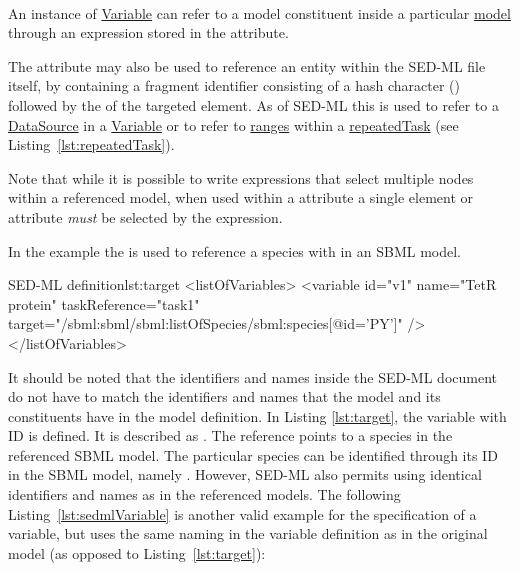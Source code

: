 \paragraph*{}
\label{sec:target}
An instance of \hyperref[class:variable]{Variable} can refer to a model constituent inside a particular \hyperref[class:model]{model} through an  expression stored in the  attribute. 

The  attribute may also be used to reference an entity within the SED-ML file itself, by containing a fragment identifier consisting of a hash character (\code{\#}) followed by the \hyperref[type:sid]{} of the targeted element. As of SED-ML \currentLV this is used to refer to a \hyperref[class:dataSource]{DataSource} in a \hyperref[class:variable]{Variable} or to refer to \hyperref[sec:listOfRanges]{ranges} within a \hyperref[class:repeatedTask]{repeatedTask} (see Listing~\ref{lst:repeatedTask}).

Note that while it is possible to write  expressions that select multiple nodes within a referenced model, when used within a  attribute a single element or attribute \emph{must} be selected by the expression.

In the example the  is used to reference a species with  in an SBML model.
\begin{myXmlLst}{SED-ML  definition}{lst:target}
<listOfVariables>
	<variable id="v1" name="TetR protein" taskReference="task1" 
		target="/sbml:sbml/sbml:listOfSpecies/sbml:species[@id='PY']" />
</listOfVariables>
\end{myXmlLst}

It should be noted that the identifiers and names inside the SED-ML document do not have to match the identifiers and names that the model and its constituents have in the model definition. In Listing \ref{lst:target}, the variable with ID  is defined. It is described as . The reference points to a species in the referenced SBML model. The particular species can be identified through its ID in the SBML model, namely . However, SED-ML also permits using identical identifiers and names as in the referenced models. The following Listing~\vref{lst:sedmlVariable} is another valid example for the specification of a variable, but uses the same naming in the variable definition as in the original model (as opposed to Listing~\ref{lst:target}):

